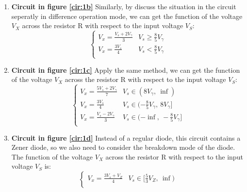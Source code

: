 \begin{enumerate}[a]
            \item \textbf{Circuit in figure \ref{cir:1b}}\newline
                Similarly, by discuss the situation in the circuit seperatly in difference operation mode, we can get the function of the voltage $V_X$ across the resistor R with respect to the input voltage $V_S$:
                \begin{equation}
                    \begin{cases}
                        V_x = \frac{V_s+2V_\gamma}{3} & V_s\ge \frac{8}{5}V_\gamma\\
                        V_x = \frac{3V_s}{4} & V_s < \frac{8}{5}V_\gamma\\
                    \end{cases}
                \label{eq:1b}
                \end{equation}

            \item \textbf{Circuit in figure \ref{cir:1c}}\newline
                Apply the same method, we can get the function of the voltage $V_X$ across the resistor R with respect to the input voltage $V_S$:
                \begin{equation}
                    \begin{cases}
                        V_x = \frac{5V_s+2V_\gamma}{7} 
                        & V_s \in (8V_\gamma,~\inf)\\

                        V_x = \frac{3V_s}{4} 
                        & V_s \in (-\frac{8}{5}V_\gamma,~8V_\gamma]\\

                        V_x = \frac{V_s-2V_\gamma}{3} 
                        & V_s \in (-\inf,~-\frac{8}{5}V_\gamma]\\
                    \end{cases}
                \label{eq:1c}
                \end{equation}

            \item \textbf{Circuit in figure \ref{cir:1d}}\newline
                Instead of a regular diode, this circuit contains a Zener diode, so we also need to consider the breakdown mode of the diode. The function of the voltage $V_X$ across the resistor R with respect to the input voltage $V_S$ is:
                \begin{equation}
                    \begin{cases}
                        V_x = \frac{3V_s+V_Z}{4} 
                        & V_s \in [\frac{5}{3}V_Z,~\inf)\\


\end{cases}
\end{equation}
\end{enumerate}
